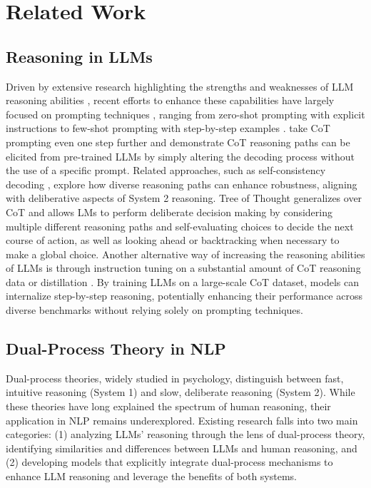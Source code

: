 \section{Related Work}
\subsection{Reasoning in LLMs}
Driven by extensive research highlighting the strengths and weaknesses of LLM reasoning abilities \citep[e.g., ][]{huang2022towards,mondorf2024beyond,valmeekam2022large,parmar2024logicbench,sourati2024arn}, recent efforts to enhance these capabilities have largely focused on prompting techniques \citep{brown2020language}, ranging from zero-shot prompting with explicit instructions \citep{kojima2022large, wang-etal-2023-plan, zhou2024self} to few-shot prompting with step-by-step examples \citep{wei2022chain}. \citet{wang2024chain} take CoT prompting even one step further and demonstrate CoT reasoning paths can be elicited from pre-trained LLMs by simply altering the decoding process without the use of a specific prompt. Related approaches, such as self-consistency decoding \cite{wang2022self}, explore how diverse reasoning paths can enhance robustness, aligning with deliberative aspects of System 2 reasoning.
Tree of Thought \citep[ToT;][]{yao2024tree} generalizes over CoT and allows LMs to perform deliberate decision making by considering multiple different reasoning paths and self-evaluating choices to decide the next course of action, as well as looking ahead or backtracking when necessary to make a global choice.
Another alternative way of increasing the reasoning abilities of LLMs is through instruction tuning on a substantial amount of CoT reasoning data \cite{chung2024scaling, huang2022large} or distillation \cite{magister2022teaching}. By training LLMs on a large-scale CoT dataset, models can internalize step-by-step reasoning, potentially enhancing their performance across diverse benchmarks without relying solely on prompting techniques. 

\subsection{Dual-Process Theory in NLP}

Dual-process theories, widely studied in psychology, distinguish between fast, intuitive reasoning (System 1) and slow, deliberate reasoning (System 2). While these theories have long explained the spectrum of human reasoning, their application in NLP remains underexplored. Existing research falls into two main categories: (1) analyzing LLMs’ reasoning through the lens of dual-process theory, identifying similarities and differences between LLMs and human reasoning, and (2) developing models that explicitly integrate dual-process mechanisms to enhance LLM reasoning and leverage the benefits of both systems.

